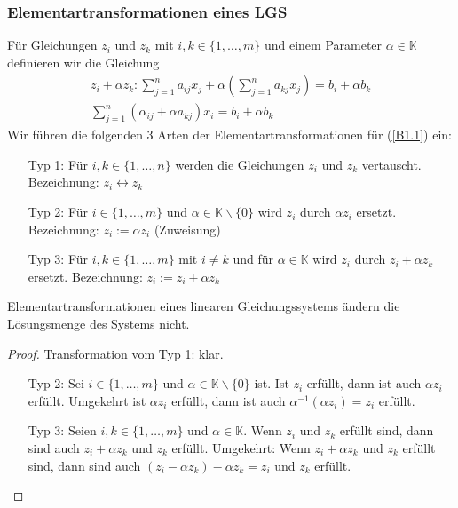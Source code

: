  \subsubsection{Elementartransformationen eines LGS}
 Für Gleichungen $ z_i $ und $ z_k $ mit $ i,k \in \{1,\ldots,m\} $ und einem Parameter $ \alpha \in \mathbb{K} $ definieren wir die Gleichung
 \begin{align*}
 	z_i + \alpha z_k : \sum_{j=1}^{n} a_{ij} x_j + \alpha (\sum_{j=1}^{n} a_{kj}x_j) = b_i + \alpha b_k \\
 	\sum_{j=1}^{n}(\alpha_{ij} + \alpha a_{kj})x_i = b_i + \alpha b_k
 \end{align*}
 Wir führen die folgenden 3 Arten der Elementartransformationen für (\ref{B1.1}) ein:
 \begin{itemize}
 	\item[Typ 1:]
 		Für $ i,k \in \{1,\ldots , n\} $ werden die Gleichungen $ z_i $ und $ z_k $ vertauscht. Bezeichnung: $ z_i \leftrightarrow z_k $
 	\item[Typ 2:]
 		Für $ i \in \{1,\ldots , m\} $ und $ \alpha \in \mathbb{K} \backslash \{0\} $ wird $ z_i $ durch $ \alpha z_i $ ersetzt. Bezeichnung: $ z_i := \alpha z_i $ (Zuweisung)
 	\item[Typ 3:]
 		 Für $ i,k \in \{1,\ldots , m\} $ mit $ i \neq k $ und für $ \alpha \in \mathbb{K} $ wird $ z_i $ durch $ z_i + \alpha z_k $ ersetzt. Bezeichnung: $ z_i :=  z_i + \alpha z_k $
 \end{itemize}
 
 \begin{propn}
 	Elementartransformationen eines linearen Gleichungssystems ändern die Lösungsmenge des Systems nicht.
 \end{propn}
 
 \begin{proof}
 	Transformation vom Typ 1: klar.
 	\begin{itemize}
 	 	\item[Typ 2:]
 	 		Sei $ i \in \{1,\ldots , m\} $ und $ \alpha \in \mathbb{K} \backslash \{0\} $ ist.
 	 		Ist $ z_i $ erfüllt, dann ist auch $ \alpha z_i $ erfüllt. Umgekehrt ist $ \alpha z_i $ erfüllt, dann ist auch $ \alpha^{-1}(\alpha z_i) = z_i $ erfüllt.
 	 	\item[Typ 3:]
 	 		 Seien $ i,k \in \{1,\ldots , m\} $ und $ \alpha \in \mathbb{K} $. Wenn $ z_i $ und $ z_k $ erfüllt sind, dann sind auch $ z_i + \alpha z_k $ und $ z_k $ erfüllt. Umgekehrt: Wenn $ z_i + \alpha z_k $ und $ z_k $ erfüllt sind, dann sind auch $ (z_i - \alpha z_k ) - \alpha z_k = z_i $ und $ z_k $ erfüllt.
 	 \end{itemize}
 \end{proof}
 
